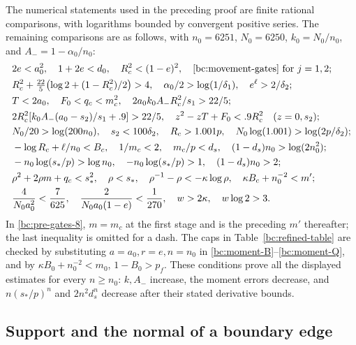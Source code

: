 The numerical statements used in the preceding proof are finite rational
comparisons, with logarithms bounded by convergent positive series.
The remaining comparisons are as follows, with $n_0=6251$,
$N_0=6250$, $k_0=N_0/n_0$, and $A_-=1-\alpha_0/n_0$:
\begin{align}
 &2e<a_0^2,\quad 1+2e<d_0,\quad R_c^2<(1-e)^2,
       \quad\eqref{bc:movement-gates}\text{ for }j=1,2;
                                                        \label{bc:pre-gates-1}\\
 &R_c^2+\tfrac{22}5\bigl(\log2+(1-R_c^2)/2\bigr)>4,
       \quad \alpha_0/2>\log(1/\delta_1),
       \quad e^\ell>2/\delta_2;                         \label{bc:pre-gates-2}\\
 &T<2a_0,\quad F_0<q_c<m_c^2,\quad
       2a_0k_0A_-R_c^2/s_1>22/5;                       \label{bc:pre-gates-3}\\
 &2R_c^2[k_0A_-(a_0-s_2)/s_1+.9]>22/5,
       \quad z^2-zT+F_0<.9R_c^2\quad(z=0,s_2);         \label{bc:pre-gates-4}\\
 &N_0/20>\log(200n_0),\quad s_2<100\delta_2,
       \quad R_c>1.001p,
       \quad N_0\log(1.001)>\log(2p/\delta_2);         \label{bc:pre-gates-5}\\
 &-\log R_c+\ell/n_0<B_c,\quad 1/m_c<2,
       \quad m_c/p<d_s,
       \quad (1-d_s)n_0>\log(2n_0^2);                 \label{bc:pre-gates-6}\\
 &-n_0\log(s_*/p)>\log n_0,\quad
       -n_0\log(s_*/p)>1,\quad(1-d_s)n_0>2;           \label{bc:pre-gates-7}\\
 &\rho^2+2\rho m+q_c<s_*^2,\quad \rho<s_*,\quad
       \rho^{-1}-\rho<-\kappa\log\rho,
       \quad \kappa B_c+n_0^{-2}<m';                 \label{bc:pre-gates-8}\\
 &\frac4{N_0a_0^2}<\frac7{625},\quad
       \frac2{N_0a_0(1-e)}<\frac1{270},\quad
       w>2\kappa,\quad w\log2>3.                     \label{bc:pre-gates-9}
\end{align}
In \eqref{bc:pre-gates-8}, $m=m_c$ at the first stage and is the
preceding $m'$ thereafter; the last inequality is omitted for a dash.
The caps in Table~\ref{bc:refined-table} are checked by substituting
$a=a_0,r=e,n=n_0$ in \eqref{bc:moment-B}--\eqref{bc:moment-Q}, and by
$\kappa B_0+n_0^{-2}<m_0$, $1-B_0>p_f$.
These conditions prove all the displayed estimates for every $n\geq n_0$:
$k,A_-$ increase, the moment errors decrease, and
$n(s_*/p)^n$ and $2n^2d_s^n$ decrease after their stated derivative
bounds.

\subsection{Support and the normal of a boundary edge}

